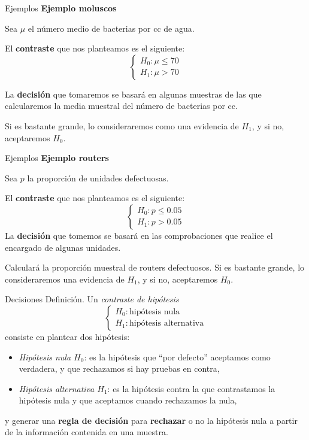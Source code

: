 \documentclass[
  ignorenonframetext,
]{beamer}
\begin{document}
\begin{frame}{Ejemplos}
\protect\hypertarget{ejemplos}{}
\textbf{Ejemplo moluscos}

Sea \(\mu\) el número medio de bacterias por cc de agua.

El \textbf{contraste} que nos planteamos es el siguiente: \[
\left\{\begin{array}{ll} 
H_{0}:\mu\leq 70\\ 
H_{1}:\mu>70
\end{array}
\right.
\]

La \textbf{decisión} que tomaremos se basará en algunas muestras de las
que calcularemos la media muestral del número de bacterias por cc.

Si es bastante grande, lo consideraremos como una evidencia de \(H_1\),
y si no, aceptaremos \(H_0\).
\end{frame}

\begin{frame}{Ejemplos}
\protect\hypertarget{ejemplos-1}{}
\textbf{Ejemplo routers}

Sea \(p\) la proporción de unidades defectuosas.

El \textbf{contraste} que nos planteamos es el siguiente: \[
\left\{\begin{array}{ll} 
H_{0}:p\leq 0.05\\ 
H_{1}:p>0.05
\end{array}
\right.
\] La \textbf{decisión} que tomemos se basará en las comprobaciones que
realice el encargado de algunas unidades.

Calculará la proporción muestral de routers defectuosos. Si es bastante
grande, lo consideraremos una evidencia de \(H_1\), y si no, aceptaremos
\(H_0\).
\end{frame}

\begin{frame}{Decisiones}
\protect\hypertarget{decisiones-3}{}
Definición. Un \emph{contraste de hipótesis} \[
\left\{\begin{array}{ll}
H_{0}:\mbox{hipótesis nula}\\ H_{1}:\mbox{hipótesis alternativa}
\end{array}
\right.
\] consiste en plantear dos hipótesis:

\begin{itemize}[<+->]
\item
  \emph{Hipótesis nula \(H_{0}\)}: es la hipótesis que ``por defecto''
  aceptamos como verdadera, y que rechazamos si hay pruebas en contra,
\item
  \emph{Hipótesis alternativa \(H_{1}\)}: es la hipótesis contra la que
  contrastamos la hipótesis nula y que aceptamos cuando rechazamos la
  nula,
\end{itemize}

y generar una \textbf{regla de decisión} para \textbf{rechazar} o no la
hipótesis nula a partir de la información contenida en una muestra.
\end{frame}
\end{document}
